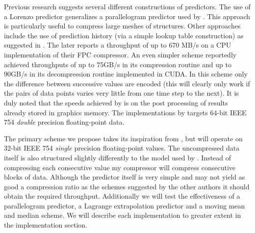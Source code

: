 \documentclass{acm_proc_article-sp}
\begin{document}
Previous research suggests several different constructions of predictors. The use of a Lorenzo predictor \cite{lindstrom2006fast} generalizes a parallelogram predictor used by \cite{engelson2000lossless}. This
approach is particularly useful to compress large meshes of structures. Other approaches include the use of prediction history (via a simple lookup table construction) as suggested in \cite{1607248,4589203,4976448}. 
The later reports a throughput of up to 670 MB/s on a CPU implementation of their FPC compressor. An even simpler scheme \cite{O'Neil:2011:FDC:1964179.1964189} reportedly achieved throughputs of up to 75GB/s in its 
compression routine and up to 90GB/s in its decompression routine implemented in CUDA. In this scheme only the difference between successive values are encoded (this will clearly only work if the pairs of 
data points varies very little from one time step to the next). It is duly noted that the speeds achieved by \cite{O'Neil:2011:FDC:1964179.1964189} is on the post processing of results already stored in 
graphics memory. The implementations by \cite{O'Neil:2011:FDC:1964179.1964189,1607248,4589203,4976448,engelson2000lossless} targets 64-bit IEEE 754 \textit{double} precision floating-point data.

The primary scheme we propose takes its inspiration from \cite{O'Neil:2011:FDC:1964179.1964189}, but will operate on 32-bit IEEE 754 \textit{single} precision floating-point values. The uncompressed data itself 
is also structured slightly differently to the model used by \cite{O'Neil:2011:FDC:1964179.1964189}. Instead of compressing each consecutive value my compressor will compress consecutive blocks of data. Although 
the predictor itself is very simple and may not yield as good a compression ratio as the schemes suggested by the other authors it should obtain the required throughput. Additionally we will test the effectiveness
of a parallelogram predictor, a Lagrange extrapolation predictor \cite{engelson2000lossless} and a moving mean and median scheme. We will describe each implementation to greater extent in the implementation section.
\end{document}
